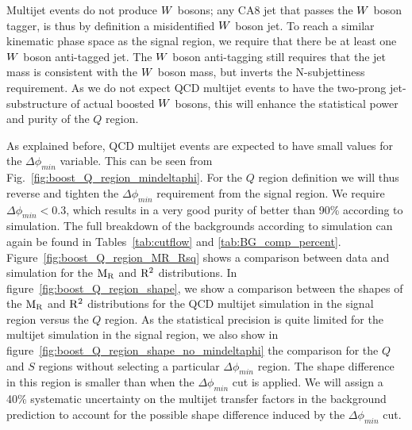 Multijet events do not produce $W$ bosons; any CA8 jet that passes the $W$ boson tagger,
is thus by definition a misidentified $W$ boson jet. To reach a similar kinematic phase space as
the signal region, we require that there be at least one $W$ boson anti-tagged jet. The $W$ boson
anti-tagging still requires that the jet mass is consistent with the $W$ boson mass, but inverts
the N-subjettiness requirement. As we do not expect QCD multijet events to have the two-prong
jet-substructure of actual boosted $W$ bosons, this will enhance the statistical power and purity
of the $Q$ region. 

As explained before, QCD multijet events are expected to have small values for the
$\Delta\phi_{min}$ variable. This can be seen from Fig.~\ref{fig:boost_Q_region_mindeltaphi}. 
For the $Q$ region definition we will thus reverse
and tighten the $\Delta\phi_{min}$ requirement from the signal region. We require $\Delta\phi_{min}
< 0.3$, which results in a very good purity of better than 90\% according to simulation. 
The full breakdown of the backgrounds according to simulation can again be found in
Tables~\ref{tab:cutflow} and \ref{tab:BG_comp_percent}.
Figure~\ref{fig:boost_Q_region_MR_Rsq} shows a comparison between data and simulation for the $\mathrm{M_R}$
and $\mathrm{R^2}$ distributions. 
In figure~\ref{fig:boost_Q_region_shape}, we show a comparison between the shapes of the $\mathrm{M_R}$ and
$\mathrm{R^2}$ distributions for the QCD multijet simulation in the signal region versus the $Q$ region. As
the statistical precision is quite limited for the multijet simulation in the signal region,
we also show in figure~\ref{fig:boost_Q_region_shape_no_mindeltaphi} the comparison for the $Q$ and
$S$ regions without selecting a particular $\Delta\phi_{min}$ region. The shape difference in this
region is smaller than when the $\Delta\phi_{min}$ cut is applied. We will assign a 40\% systematic
uncertainty on the multijet transfer factors in the background prediction to account for the
possible shape difference induced by the $\Delta\phi_{min}$ cut. 




